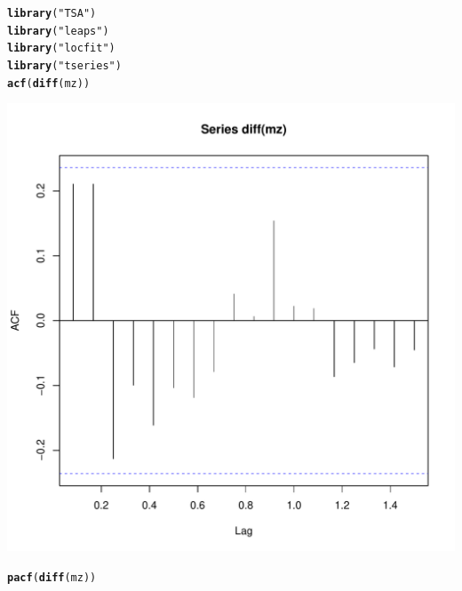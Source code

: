 \documentclass{article}\usepackage[]{graphicx}\usepackage[]{color}
\makeatletter
\def\maxwidth{ %
  \ifdim\Gin@nat@width>\linewidth
    \linewidth
  \else
    \Gin@nat@width
  \fi
}
\newcommand{\hlstr}[1]{\textcolor[rgb]{0.192,0.494,0.8}{#1}}%
\newcommand{\hlstd}[1]{\textcolor[rgb]{0.345,0.345,0.345}{#1}}%
\newcommand{\hlkwd}[1]{\textcolor[rgb]{0.737,0.353,0.396}{\textbf{#1}}}%
\newenvironment{kframe}{%
 \def\at@end@of@kframe{}%
 \ifinner\ifhmode%
  \def\at@end@of@kframe{\end{minipage}}%
  \begin{minipage}{\columnwidth}%
 \fi\fi%
 \def\FrameCommand##1{\hskip\@totalleftmargin \hskip-\fboxsep
 \colorbox{shadecolor}{##1}\hskip-\fboxsep
     \hskip-\linewidth \hskip-\@totalleftmargin \hskip\columnwidth}%
 \MakeFramed {\advance\hsize-\width
   \@totalleftmargin\z@ \linewidth\hsize
   \@setminipage}}%
 {\par\unskip\endMakeFramed%
 \at@end@of@kframe}
\newenvironment{knitrout}{}{} %
\makeatother
\begin{document}
\begin{knitrout}
\color{fgcolor}\begin{kframe}
\begin{alltt}
\hlkwd{library}\hlstd{(}\hlstr{"TSA"}\hlstd{)}
\hlkwd{library}\hlstd{(}\hlstr{"leaps"}\hlstd{)}
\hlkwd{library}\hlstd{(}\hlstr{"locfit"}\hlstd{)}
\hlkwd{library}\hlstd{(}\hlstr{"tseries"}\hlstd{)}
\hlkwd{acf}\hlstd{(}\hlkwd{diff}\hlstd{(mz))}
\end{alltt}
\end{kframe}
\includegraphics[width=\maxwidth]{figure/unnamed-chunk-2-1} 
\begin{kframe}\begin{alltt}
\hlkwd{pacf}\hlstd{(}\hlkwd{diff}\hlstd{(mz))}
\end{alltt}
\end{kframe}

\end{knitrout}
\end{document}
